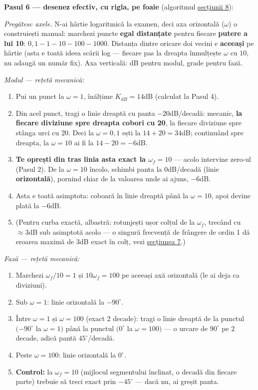 \documentclass[10pt,a4paper]{article}
\newcommand{\tip}[1]{\textcolor{blue!55!black}{#1}}
\begin{document}
\textbf{Pasul 6 — desenez efectiv, cu rigla, pe foaie} (algoritmul \hyperref[sec:8]{secțiunii 8}):

\textit{Pregătesc axele.} N-ai hârtie logaritmică la examen, deci axa orizontală ($\omega$) o construiești manual: marchezi puncte \textbf{egal distanțate} pentru fiecare \textbf{putere a lui 10}: $0{,}1-1-10-100-1000$. Distanța dintre oricare doi vecini e \textbf{aceeași} pe hârtie (asta e toată ideea scării log — fiecare pas la dreapta înmulțește $\omega$ cu $10$, nu adaugă un număr fix). Axa verticală: dB pentru modul, grade pentru fază.

\textit{Modul — rețetă mecanică:}
\begin{enumerate}
\item Pui un punct la $\omega{=}1$, înălțime $K_{dB}{=}14$dB (calculat la Pasul 4).
\item Din acel punct, tragi o linie dreaptă cu panta $-20$dB/decadă: mecanic, \textbf{la fiecare diviziune spre dreapta cobori cu 20}, la fiecare diviziune spre stânga urci cu 20. Deci la $\omega{=}0{,}1$ ești la $14{+}20{=}34$dB; continuând spre dreapta, la $\omega{=}10$ ai fi la $14{-}20{=}{-}6$dB.
\item \textbf{Te oprești din tras linia asta exact la $\omega_f{=}10$} — acolo intervine zero-ul (Pasul 2). De la $\omega{=}10$ încolo, schimbi panta la $0$dB/decadă (linie \textbf{orizontală}), pornind chiar de la valoarea unde ai ajuns, $-6$dB.
\item Asta e toată asimptota: coboară în linie dreaptă până la $\omega{=}10$, apoi devine plată la $-6$dB.
\item (Pentru curba exactă, albastră: rotunjești ușor colțul de la $\omega_f$, trecând cu $\approx3$dB sub asimptotă acolo — o singură frecvență de frângere de ordin 1 dă eroarea maximă de $3$dB exact în colț, vezi \hyperref[sec:7]{secțiunea 7}.)
\end{enumerate}

\textit{Fază — rețetă mecanică:}
\begin{enumerate}
\item Marchezi $\omega_f/10{=}1$ și $10\omega_f{=}100$ pe aceeași axă orizontală (le ai deja ca diviziuni).
\item Sub $\omega{=}1$: linie orizontală la $-90^\circ$.
\item Între $\omega{=}1$ și $\omega{=}100$ (exact $2$ decade): tragi o linie dreaptă de la punctul $({-}90^\circ$ la $\omega{=}1)$ până la punctul $(0^\circ$ la $\omega{=}100)$ — o urcare de $90^\circ$ pe $2$ decade, adică pantă $45^\circ$/decadă.
\item Peste $\omega{=}100$: linie orizontală la $0^\circ$.
\item \tip{\textbf{Control:} la $\omega_f{=}10$ (mijlocul segmentului înclinat, o decadă din fiecare parte) trebuie să treci exact prin $-45^\circ$ — dacă nu, ai greșit panta.}
\end{enumerate}
\end{document}
